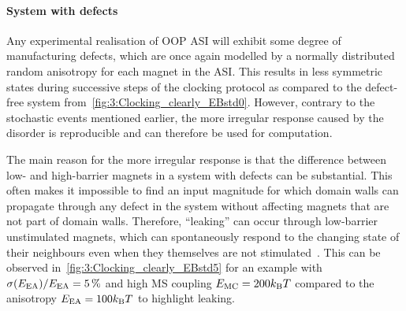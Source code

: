 \paragraph{System with defects}
Any experimental realisation of OOP ASI will exhibit some degree of manufacturing defects, which are once again modelled by a normally distributed random anisotropy for each magnet in the ASI.
This results in less symmetric states during successive steps of the clocking protocol as compared to the defect-free system from~\cref{fig:3:Clocking_clearly_EBstd0}.
However, contrary to the stochastic events mentioned earlier, the more irregular response caused by the disorder is reproducible and can therefore be used for computation. \par
The main reason for the more irregular response is that the difference between low- and high-barrier magnets in a system with defects can be substantial.
This often makes it impossible to find an input magnitude for which domain walls can propagate through any defect in the system without affecting magnets that are not part of domain walls.
Therefore, ``leaking'' can occur through low-barrier unstimulated magnets, which can spontaneously respond to the changing state of their neighbours even when they themselves are not stimulated~\cite{DisorderGroundStateASI}. %
This can be observed in~\cref{fig:3:Clocking_clearly_EBstd5} for an example with $\sigma(E_\mathrm{EA})/E_\mathrm{EA} = \SI{5}{\percent}$ and high MS coupling $\EMC = 200 \kBT$ compared to the anisotropy $\EEA = 100 \kBT$ to highlight leaking.


